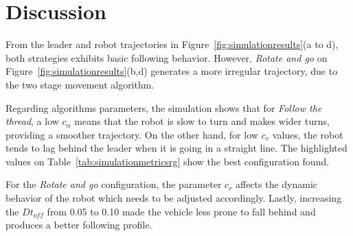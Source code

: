 \documentclass[journal]{IEEEtran}
\begin{document}
\section{Discussion}
\label{discussion}

From the leader and robot trajectories in Figure~\ref{fig:simulationresults}(a to d), both strategies exhibits basic following behavior.  However, \textit{Rotate and go} on Figure~\ref{fig:simulationresults}(b,d) generates a more irregular trajectory, due to the two stage movement algorithm.   

Regarding algorithms parameters, the simulation shows that for \textit{Follow the thread}, a low $c_{\alpha}$  means that the robot is slow to turn and makes wider turns, providing a smoother trajectory.  On the other hand, for low $c_v$ values, the robot tends to lag behind the leader when it is going in a straight line.  The highlighted values on Table~\ref{tab:simulationmetricsrg} show the best configuration found.  

For the \textit{Rotate and go} configuration, the parameter $c_r$ affects the dynamic behavior of the robot which needs to be adjusted accordingly.  Lastly, increasing the $Dt_{off}$ from 0.05 to 0.10 made the vehicle less prone to fall behind and produces a better following profile.



\end{document}
